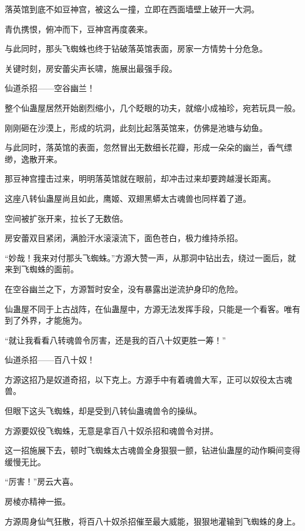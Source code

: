
\begin{this_body}



落英馆到底不如豆神宫，被这么一撞，立即在西面墙壁上破开一大洞。

青仇携恨，俯冲而下，豆神宫再度袭来。

与此同时，那头飞蜘蛛也终于钻破落英馆表面，房家一方情势十分危急。

关键时刻，房安蕾尖声长啸，施展出最强手段。

仙道杀招——空谷幽兰！

整个仙蛊屋居然开始剧烈缩小，几个眨眼的功夫，就缩小成袖珍，宛若玩具一般。

刚刚砸在沙漠上，形成的坑洞，此刻比起落英馆来，仿佛是池塘与幼鱼。

与此同时，落英馆的表面，忽然冒出无数细长花瓣，形成一朵朵的幽兰，香气缥缈，逸散开来。

那豆神宫撞击过来，明明落英馆就在眼前，却冲击过来却要跨越漫长距离。

这座八转仙蛊屋尚且如此，鹰姬、双翅黑蟒太古魂兽也同样着了道。

空间被扩张开来，拉长了无数倍。

房安蕾双目紧闭，满脸汗水滚滚流下，面色苍白，极力维持杀招。

“妙哉！我来对付那头飞蜘蛛。”方源大赞一声，从那洞中钻出去，绕过一面后，就来到飞蜘蛛的面前。

在空谷幽兰之下，方源暂时安全，没有暴露出逆流护身印的危险。

仙蛊屋不同于上古战阵，在仙蛊屋中，方源无法发挥手段，只能是一个看客。唯有到了外界，才能施为。

“就让我看看八转魂兽令厉害，还是我的百八十奴更胜一筹！”

仙道杀招——百八十奴！

方源这招乃是奴道奇招，以下克上。方源手中有着魂兽大军，正可以奴役太古魂兽。

但眼下这头飞蜘蛛，却是受到八转仙蛊魂兽令的操纵。

方源要奴役飞蜘蛛，无意是拿百八十奴杀招和魂兽令对拼。

这一招施展下去，顿时飞蜘蛛太古魂兽全身狠狠一颤，钻进仙蛊屋的动作瞬间变得缓慢无比。

“厉害！”房云大喜。

房棱亦精神一振。

方源周身仙气狂散，将百八十奴杀招催至最大威能，狠狠地灌输到飞蜘蛛的身上。


\end{this_body}
